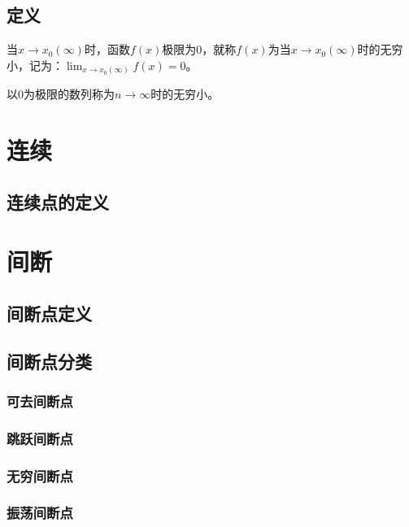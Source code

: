 \documentclass[UTF8]{ctexart}
\begin{document}
\subsection{定义}

当$x\to x_0(\infty)$时，函数$f(x)$极限为0，就称$f(x)$为当$x\to x_0(\infty)$时的无穷小，记为：$\lim_{x\to x_0(\infty)}f(x)=0$。

以0为极限的数列称为$n\to\infty$时的无穷小。

\section{连续}
\subsection{连续点的定义}
\section{间断}
\subsection{间断点定义}
\subsection{间断点分类}
\subsubsection{可去间断点}
\subsubsection{跳跃间断点}
\subsubsection{无穷间断点}
\subsubsection{振荡间断点}
\end{document}
